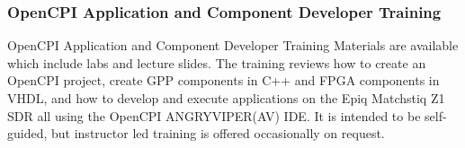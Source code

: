 \subsubsection*{OpenCPI Application and Component Developer Training}
OpenCPI Application and Component Developer Training Materials are available which include labs and lecture slides. The training reviews how to create an OpenCPI project, create GPP components in C++ and FPGA components in VHDL, and how to develop and execute applications on the Epiq Matchstiq Z1 SDR all using the OpenCPI ANGRYVIPER(AV) IDE. It is intended to be self-guided, but instructor led training is offered occasionally on request.\par\bigskip


